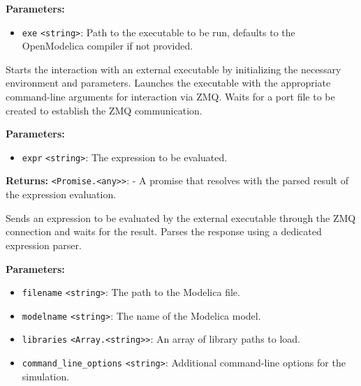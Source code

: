 \documentclass[12pt,a4paper]{article}
\begin{document}
\noindent \textbf{Parameters:}
\begin{itemize}
  \item \texttt{exe} \texttt{<string>}: Path to the executable to be run, defaults to the OpenModelica compiler if not provided.
\end{itemize}

\noindent Starts the interaction with an external executable by initializing the necessary environment and parameters.
Launches the executable with the appropriate command-line arguments for interaction via ZMQ.
Waits for a port file to be created to establish the ZMQ communication.

\vspace{5mm}
\noindent {}


\noindent \textbf{Parameters:}
\begin{itemize}
  \item \texttt{expr} \texttt{<string>}: The expression to be evaluated.
\end{itemize}

\noindent \textbf{Returns:} \texttt{<Promise.<any>>}: - A promise that resolves with the parsed result of the expression evaluation.

\noindent Sends an expression to be evaluated by the external executable through the ZMQ connection and waits for the result.
Parses the response using a dedicated expression parser.

\vspace{5mm}
\noindent {}


\noindent \textbf{Parameters:}
\begin{itemize}
  \item \texttt{filename} \texttt{<string>}: The path to the Modelica file.
  \item \texttt{modelname} \texttt{<string>}: The name of the Modelica model.
  \item \texttt{libraries} \texttt{<Array.<string>>}: An array of library paths to load.
  \item \texttt{command\_line\_options} \texttt{<string>}: Additional command-line options for the simulation.
\end{itemize}
\end{document}
